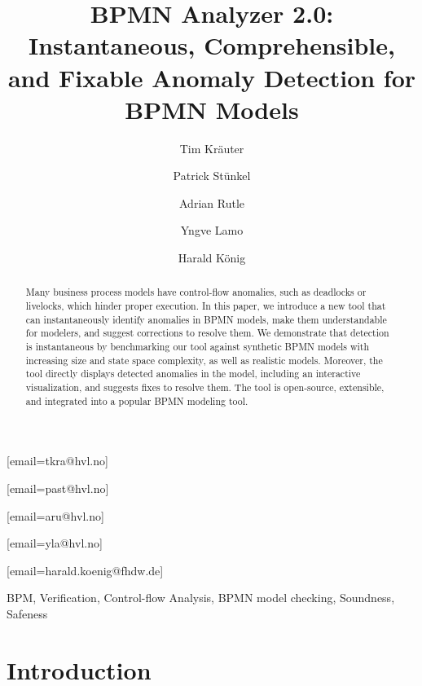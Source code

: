 \documentclass[
]{ceurart}
\begin{document}


\title{BPMN Analyzer 2.0: Instantaneous, Comprehensible, and Fixable Anomaly Detection for BPMN Models}

\author[1]{Tim Kräuter}
[email=tkra@hvl.no]
\author[1]{Patrick Stünkel}
[email=past@hvl.no] %
\author[1]{Adrian Rutle}
[email=aru@hvl.no]
\author[1]{Yngve Lamo}
[email=yla@hvl.no]
\author[2,1]{Harald König}
[email=harald.koenig@fhdw.de]
\address[1]{Western Norway University of Applied Sciences, Bergen, Norway}
\address[2]{FHDW Hannover, Germany}

\begin{abstract}
Many business process models have control-flow anomalies, such as deadlocks or livelocks, which hinder proper execution.
In this paper, we introduce a new tool that can instantaneously identify anomalies in BPMN models, make them understandable for modelers, and suggest corrections to resolve them.
We demonstrate that detection is instantaneous by benchmarking our tool against synthetic BPMN models with increasing size and state space complexity, as well as realistic models.
Moreover, the tool directly displays detected anomalies in the model, including an interactive visualization, and suggests fixes to resolve them.
The tool is open-source, extensible, and integrated into a popular BPMN modeling tool.
\end{abstract}

\begin{keywords}
BPM,
Verification,
Control-flow Analysis,
BPMN model checking,
Soundness,
Safeness
\end{keywords}

\maketitle


\section{Introduction}
\end{document}
